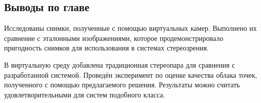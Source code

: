 \subsection{Выводы по главе}

Исследованы снимки, полученные с помощью виртуальных камер. Выполнено их сравнение с эталонными изображениями,  
которое продемонстрировало пригодность снимков для использования в системах стереозрения.

В виртуальную среду добавлена традиционная стереопара для сравнения с разработанной системой. Проведён эксперимент
по оценке качества облака точек, полученного с помощью предлагаемого решения. Результаты можно считать удовлетворительными 
для систем подобного класса. %


